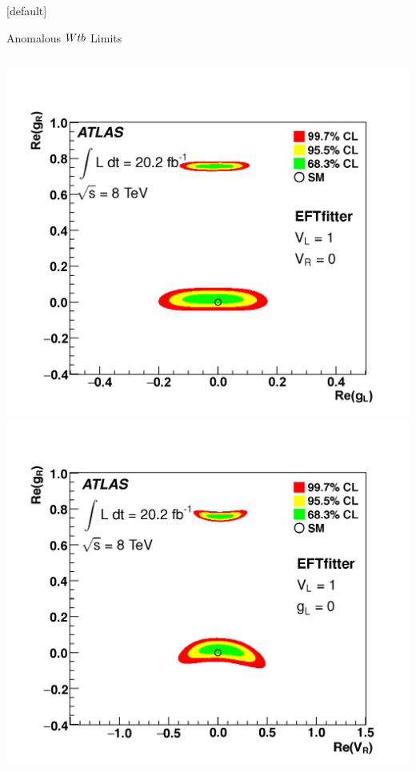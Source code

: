 \documentclass{beamer}
\newcommand*{\Wtb}{\ensuremath{W\lowercase{tb}}\xspace}
\begin{document}
{  \makeatletter %
  [default]
  \def\beamer@entrycode{\vspace*{-1.075\headheight}}
  \begin{frame}{Anomalous \Wtb Limits}
    \vspace{3pt}    
    \begin{columns}
      \includegraphics[width=\textwidth]{figures/glgr}
      \includegraphics[width=\textwidth]{figures/vrgr}

\end{columns}
\end{frame}}
\end{document}
